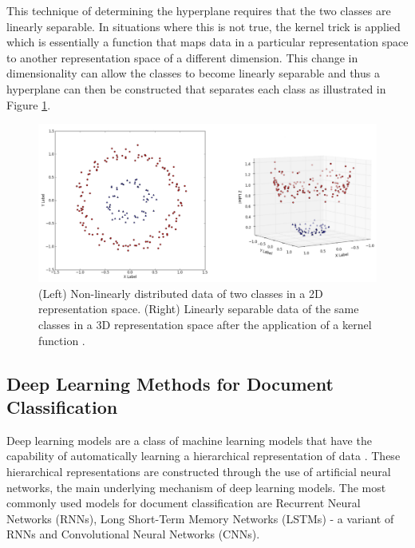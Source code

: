 \documentclass[a4paper,twoside,phd]{BYUPhys}
\begin{document}
This technique of determining the hyperplane requires that the two classes are linearly separable. In situations where this is not true, the kernel trick \cite{aizerman67theoretical} is applied which is essentially a function that maps data in a particular representation space to another representation space of a different dimension. This change in dimensionality can allow the classes to become linearly separable and thus a hyperplane can then be constructed that separates each class as illustrated in Figure \ref{fig:KernelTrick}.

\begin{figure}[H]
	\centering
	\includegraphics[totalheight=7cm]{images/kernel-trick.png}
	\caption{(Left) Non-linearly distributed data of two classes in a 2D representation space. \newline
		(Right) Linearly separable data of the same classes in a 3D representation space after the application of a kernel function \cite{UnderstandingKernel}.}
	\label{fig:KernelTrick}
\end{figure}

\subsection{Deep Learning Methods for Document Classification}
\label{sec:DLDocumentClassification}

Deep learning models are a class of machine learning models that have the capability of automatically learning a hierarchical representation of data \cite{Basheer2000}. These hierarchical representations are constructed through the use of artificial neural networks, the main underlying mechanism of deep learning models. The most commonly used models for document classification are Recurrent Neural Networks (RNNs), Long Short-Term Memory Networks (LSTMs) - a variant of RNNs and Convolutional Neural Networks (CNNs). \newline
\end{document}
